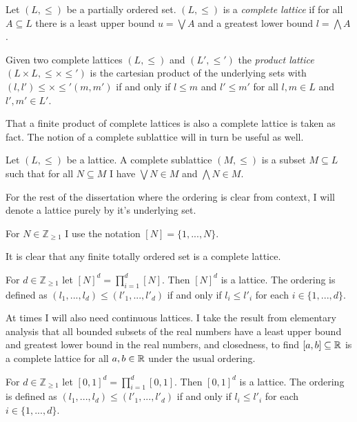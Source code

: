 \begin{definition}
  Let $(L, \leq)$ be a partially ordered set. $(L, \leq)$ is a \emph{complete lattice} if for all
  $A \subseteq L$ there is a least upper bound $u = \bigvee A$ and a greatest lower bound $l = \bigwedge A$.
\end{definition}
\begin{definition}
  Given two complete lattices $(L, \leq)$ and $(L', \leq')$ the \emph{product lattice} $(L \times L, \leq \times \leq')$
  is the cartesian product of the underlying sets with $(l, l') \leq \times \leq' (m, m')$ if and only if
  $l \leq m$ and $l' \leq m'$ for all $l, m \in L$ and $l', m' \in L'$.
\end{definition}
That a finite product of complete lattices is also a complete lattice is taken as fact.
The notion of a complete sublattice will in turn be useful as well.
\begin{definition}[Sublattice]
  Let $(L, \leq)$ be a lattice. A complete sublattice $(M, \leq)$ is a
  subset $M \subseteq L$ such that for all $N \subseteq M$ I have $\bigvee N \in M$
  and $\bigwedge N \in M$.
\end{definition}
For the rest of the dissertation where the ordering is clear from context, I will denote a lattice purely by
it's underlying set.
\begin{notation}
  For $N \in \mathbb{Z}_{\geq 1}$ I use the notation $[N] = \{1, ..., N\}$.
\end{notation}
It is clear that any finite totally ordered set is a complete lattice.
\begin{cor}
  For $d \in \mathbb{Z}_{\geq 1}$ let $[N]^d = \prod_{i=1}^d [N]$. Then $[N]^d$ is a lattice. 
  The ordering is defined as $(l_1, ..., l_d) \leq (l'_1, ..., l'_d)$
  if and only if $l_i \leq l'_i$ for each $i \in \{1, ..., d\}$.
\end{cor}
At times I will also need continuous lattices. I take the result from elementary analysis
that all bounded subsets of the real numbers have a least upper bound and greatest lower bound
in the real numbers, and closedness, to find $[a, b] \subseteq \mathbb{R}$ is a complete lattice for all $a, b \in \mathbb{R}$
under the usual ordering.
\begin{cor}
  For $d \in \mathbb{Z}_{\geq 1}$ let $[0, 1]^d = \prod_{i=1}^d [0, 1]$. Then $[0, 1]^d$ is a lattice. 
  The ordering is defined as $(l_1, ..., l_d) \leq (l'_1, ..., l'_d)$
  if and only if $l_i \leq l'_i$ for each $i \in \{1, ..., d\}$.
\end{cor}
